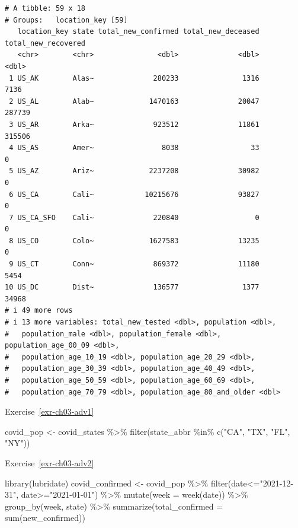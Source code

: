 \documentclass[
  letterpaper,
  DIV=11,
  numbers=noendperiod]{scrreprt}
\newenvironment{Shaded}{\begin{snugshade}}{\end{snugshade}}
\newcommand{\AttributeTok}[1]{\textcolor[rgb]{0.40,0.45,0.13}{#1}}
\newcommand{\FunctionTok}[1]{\textcolor[rgb]{0.28,0.35,0.67}{#1}}
\newcommand{\NormalTok}[1]{\textcolor[rgb]{0.00,0.23,0.31}{#1}}
\newcommand{\OtherTok}[1]{\textcolor[rgb]{0.00,0.23,0.31}{#1}}
\newcommand{\SpecialCharTok}[1]{\textcolor[rgb]{0.37,0.37,0.37}{#1}}
\newcommand{\StringTok}[1]{\textcolor[rgb]{0.13,0.47,0.30}{#1}}
\theoremstyle{definition}
\theoremstyle{remark}
\begin{document}
\begin{verbatim}
# A tibble: 59 x 18
# Groups:   location_key [59]
   location_key state total_new_confirmed total_new_deceased total_new_recovered
   <chr>        <chr>               <dbl>              <dbl>               <dbl>
 1 US_AK        Alas~              280233               1316                7136
 2 US_AL        Alab~             1470163              20047              287739
 3 US_AR        Arka~              923512              11861              315506
 4 US_AS        Amer~                8038                 33                   0
 5 US_AZ        Ariz~             2237208              30982                   0
 6 US_CA        Cali~            10215676              93827                   0
 7 US_CA_SFO    Cali~              220840                  0                   0
 8 US_CO        Colo~             1627583              13235                   0
 9 US_CT        Conn~              869372              11180                5454
10 US_DC        Dist~              136577               1377               34968
# i 49 more rows
# i 13 more variables: total_new_tested <dbl>, population <dbl>,
#   population_male <dbl>, population_female <dbl>, population_age_00_09 <dbl>,
#   population_age_10_19 <dbl>, population_age_20_29 <dbl>,
#   population_age_30_39 <dbl>, population_age_40_49 <dbl>,
#   population_age_50_59 <dbl>, population_age_60_69 <dbl>,
#   population_age_70_79 <dbl>, population_age_80_and_older <dbl>
\end{verbatim}

Exercise~\ref{exr-ch03-adv1}

\begin{Shaded}
\begin{Highlighting}[]
\NormalTok{covid\_pop }\OtherTok{\textless{}{-}}\NormalTok{ covid\_states }\SpecialCharTok{\%\textgreater{}\%} 
  \FunctionTok{filter}\NormalTok{(state\_abbr }\SpecialCharTok{\%in\%} \FunctionTok{c}\NormalTok{(}\StringTok{"CA"}\NormalTok{, }\StringTok{"TX"}\NormalTok{, }\StringTok{"FL"}\NormalTok{, }\StringTok{"NY"}\NormalTok{))}
\end{Highlighting}
\end{Shaded}

Exercise~\ref{exr-ch03-adv2}

\begin{Shaded}
\begin{Highlighting}[]
\FunctionTok{library}\NormalTok{(lubridate)}
\NormalTok{covid\_confirmed }\OtherTok{\textless{}{-}}\NormalTok{ covid\_pop }\SpecialCharTok{\%\textgreater{}\%}
  \FunctionTok{filter}\NormalTok{(date}\SpecialCharTok{\textless{}=}\StringTok{"2021{-}12{-}31"}\NormalTok{, date}\SpecialCharTok{\textgreater{}=}\StringTok{"2021{-}01{-}01"}\NormalTok{) }\SpecialCharTok{\%\textgreater{}\%}
  \FunctionTok{mutate}\NormalTok{(}\AttributeTok{week =} \FunctionTok{week}\NormalTok{(date)) }\SpecialCharTok{\%\textgreater{}\%} 
  \FunctionTok{group\_by}\NormalTok{(week, state) }\SpecialCharTok{\%\textgreater{}\%} 
  \FunctionTok{summarize}\NormalTok{(}\AttributeTok{total\_confirmed =} \FunctionTok{sum}\NormalTok{(new\_confirmed))}
\end{Highlighting}
\end{Shaded}
\end{document}
